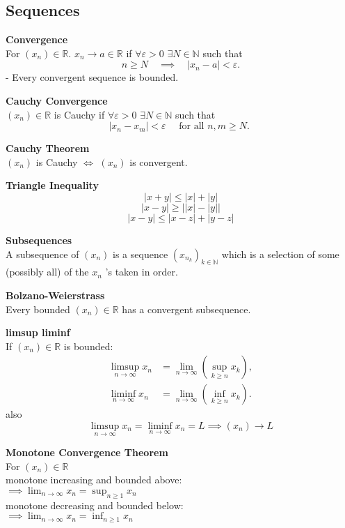 \documentclass[a4paper, 10pt]{article}
\begin{document}
\begin{multicols*}{3}
\section*{Sequences}

\textbf{Convergence}\\ 
For $\left(x_n\right)\in\mathbb{R}$. $x_n \rightarrow a\in\mathbb{R}$ if $\forall\varepsilon>0$ $\exists N \in \mathbb{N}$ such that
$$
n \geq N \quad \implies \quad\left|x_n-a\right|<\varepsilon .
$$
- Every convergent sequence is bounded. 

\textbf{Cauchy Convergence}\\
$\left(x_n\right)\in \mathbb{R}$ is Cauchy if $\forall\varepsilon>0$ $\exists N \in \mathbb{N}$ such that
$$
\left|x_n-x_m\right|<\varepsilon \quad \text { for all } n, m \geq N \text {. }
$$

\textbf{Cauchy Theorem}\\
$\left(x_n\right)$ is Cauchy $\iff$  $\left(x_n\right)$ is convergent.

\textbf{Triangle Inequality}
$$|x+y|\leq|x|+|y|$$
$$|x-y|\geq \left| |x|-|y| \right|$$
$$|x-y|\leq|x-z|+|y-z|$$

\textbf{Subsequences}\\
A subsequence of $\left(x_n\right)$ is a sequence $\left(x_{n_k}\right)_{k \in \mathbb{N}}$ which is a selection of some (possibly all) of the $x_n$ 's taken in order.

\textbf{Bolzano-Weierstrass}\\
Every bounded $(x_n)\in\mathbb{R}$ has a convergent subsequence. 

\textbf{limsup liminf} \\
If $\left(x_n\right)\in\mathbb{R}$ is bounded: 
\begin{align*}
\limsup _{n \rightarrow \infty} x_n &= \lim _{n \rightarrow \infty}\left(\sup _{k \geq n} x_k\right), \\
\liminf _{n \rightarrow \infty} x_n &= \lim _{n \rightarrow \infty}\left(\inf _{k \geq n} x_k\right) .
\end{align*}
also
$$
\limsup _{n \rightarrow \infty} x_n=\liminf _{n \rightarrow \infty} x_n  = L \implies (x_n)\rightarrow L
$$

\textbf{Monotone Convergence Theorem} \\
For $\left(x_n\right)\in\mathbb{R}$\\
monotone increasing and bounded above:\\
$\implies\lim _{n \rightarrow \infty} x_n=\sup _{n \geq 1} x_n$\\
monotone decreasing and bounded below: \\
$\implies\lim _{n \rightarrow \infty} x_n=\inf _{n \geq 1} x_n$


\end{multicols*}
\end{document}
